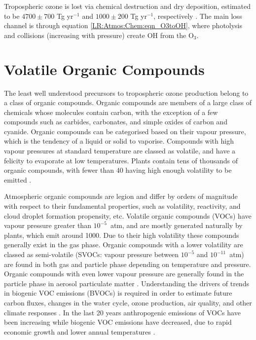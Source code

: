     Tropospheric ozone is lost via chemical destruction and dry deposition, estimated to be $4700\pm700$ Tg yr$^{-1}$ and $1000\pm200$ Tg yr$^{-1}$, respectively \parencite{Stevenson2006,Young2018}.
    The main loss channel is through equation \ref{LR:Atmos:Chem:eqn_O3toOH}, where photolysis and collisions (increasing with pressure) create OH from the O$_3$.
    

\section{Volatile Organic Compounds}
\label{LR:VOCs}

  The least well understood precursors to tropospheric ozone production belong to a class of organic compounds.
  Organic compounds are members of a large class of chemicals whose molecules contain carbon, with the exception of a few compounds such as carbides, carbonates, and simple oxides of carbon and cyanide.
  Organic compounds can be categorised based on their vapour pressure, which is the tendency of a liquid or solid to vaporise.
  Compounds with high vapour pressures at standard temperature are classed as volatile, and have a felicity to evaporate at low temperatures.
  Plants contain tens of thousands of organic compounds, with fewer than 40 having high enough volatility to be emitted \parencite{Guenther2000}.
  
  Atmospheric organic compounds are legion and differ by orders of magnitude with respect to their fundamental properties, such as volatility, reactivity, and cloud droplet formation propensity, etc.
  Volatile organic compounds (VOCs) have vapour pressure greater than $10^{-5}$~atm, and are mostly generated naturally by plants, which emit around 1000\tgpyr \parencite{Guenther1995, Glasius2016}.
  Due to their high volatility these compounds generally exist in the gas phase.
  Organic compounds with a lower volatility are classed as semi-volatile (SVOCs: vapour pressure between $10^{-5}$ and $10^{-11}$~atm) are found in both gas and particle phase depending on temperature and pressure.
  Organic compounds with even lower vapour pressure are generally found in the particle phase in aerosol particulate matter \parencite{Glasius2016}.
  Understanding the drivers of trends in biogenic VOC emissions (BVOCs) is required in order to estimate future carbon fluxes, changes in the water cycle, ozone production, air quality, and other climate responses \parencite{Yue2015}.
  In the last 20 years anthropogenic emissions of VOCs have been increasing while biogenic VOC emissions have decreased, due to rapid economic growth and lower annual temperatures \parencite{Stavrakou2014, Kwon2017}.
  
